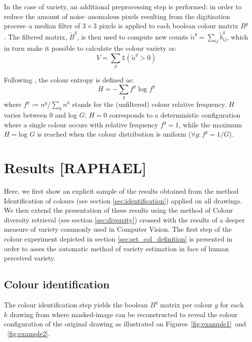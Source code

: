 \documentclass[11pt,a4paper]{article}
\begin{document}
In the case of variety, an additional preprocessing step is performed: in order to reduce the amount of noise--anomalous pixels resulting from the digitisation process--a median filter of \(3 \times 3\) pixels is applied to each boolean colour matrix $B^{g}$. The filtered matrix, $\tilde{B}^{g}$, is then used to compute new counts $\tilde{n}^{g} = \sum_{ij}\tilde{b}_{ij}^{g}$, which in turn make it possible to calculate the colour variety as:
\begin{equation}
	V = \sum_{g}\mathds{1}(\tilde{n}^{g} > 0)
\end{equation}

Following \citet{Shannon1948}, the colour entropy is defined as:
\begin{equation}
	H = -\sum_{g} f^{g}\mbox{ log }f^{g}
\end{equation}
where $f^{g}:= n^{g}/\sum_{k}n^{k}$ stands for the (unfiltered) colour relative frequency. $H$ varies between 0 and log $G$: $H=0$ corresponds to a deterministic configuration where a single colour occurs with relative frequency $f^{g} = 1$, while the maximum $H=\mbox{log }G$ is reached when the colour distribution is uniform ($\forall g: f^{g} = 1/G$).



\section{Results [RAPHAEL]}
Here, we first show an explicit sample of the results obtained from the method Identification of colours (see section \ref{sec:identification}) applied on all drawings. 
We then extend the presentation of these results using the method of Colour diversity retrieval (see section \ref{sec:diversity}) crossed with the results of a deeper measure of variety commonly used in Computer Vision. 
The first step of the colour experiment depicted in section \ref{sec:set_col_definition} is presented in order to asses the automatic method of variety estimation in face of human perceived variety.

\subsection{Colour identification}
\label{sec:results_identification}
The colour identification step yields the boolean $B^g$ matrix per colour $g$ for each $k$ drawing from where masked-image can be reconstructed to reveal the colour configuration of the original drawing as illustrated on Figures~\ref{fig:example1}~and ~\ref{fig:example2}.
\end{document}
